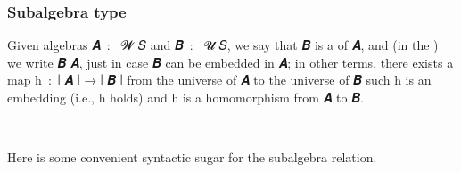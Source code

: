 \documentclass[a4paper,UKenglish,cleveref,autoref,thm-restate]{lipics-v2021}
\begin{document}
\subsubsection{Subalgebra type}\label{sssec:subalgebra-type}
Given algebras \ab 𝑨~\as :~ \ab 𝓦 \ab 𝑆 and \ab 𝑩~\as :~ \ab 𝓤 \ab 𝑆, we say that \ab 𝑩 is a  of \ab 𝑨, and (in the \ualib) we write \af 𝑩  \ab 𝑨, just in case \ab 𝑩 can be embedded in \ab 𝑨; in other terms, there exists a map \ab h~\as :~\af ∣ \ab 𝑨 \af ∣ → \af ∣ 𝑩 \af ∣ from the universe of \ab 𝑨 to the universe of \ab 𝑩 such \ab h is an embedding (i.e.,  \ab h holds) and \ab h is a homomorphism from \ab 𝑨 to \ab 𝑩.
\ccpad
\begin{code}%
\>[0]\AgdaSpace{}%
\AgdaSymbol{:}\AgdaSpace{}%
\AgdaSymbol{\{}\AgdaSpace{}%
\AgdaSpace{}%
\AgdaSymbol{:}\AgdaSpace{}%
\AgdaSymbol{\}(}\AgdaSpace{}%
\AgdaSymbol{:}\AgdaSpace{}%
\AgdaSpace{}%
\AgdaSpace{}%
\AgdaSymbol{)(}\AgdaSpace{}%
\AgdaSymbol{:}\AgdaSpace{}%
\AgdaSpace{}%
\AgdaSpace{}%
\AgdaSymbol{)}\AgdaSpace{}%
\AgdaSpace{}%
\AgdaSpace{}%
\AgdaSpace{}%
\AgdaSpace{}%
\AgdaSpace{}%
\AgdaSpace{}%
\AgdaSpace{}%
\AgdaSpace{}%
\<%
\\
\>[0]\AgdaSpace{}%
\AgdaSpace{}%
\AgdaSpace{}%
\AgdaSymbol{=}\AgdaSpace{}%
\AgdaSpace{}%
\AgdaSpace{}%
\AgdaSpace{}%
\AgdaSymbol{(}\AgdaSpace{}%
\AgdaSpace{}%
\AgdaSpace{}%
\AgdaSpace{}%
\AgdaSpace{}%
\AgdaSpace{}%
\AgdaSymbol{)}\AgdaSpace{}%
\AgdaFunction{,}\AgdaSpace{}%
\AgdaSpace{}%
\AgdaSpace{}%
\AgdaSpace{}%
\AgdaSpace{}%
\AgdaSpace{}%
\AgdaSpace{}%
\<
\end{code}
\ccpad
Here is some convenient syntactic sugar for the subalgebra relation.
\end{document}
